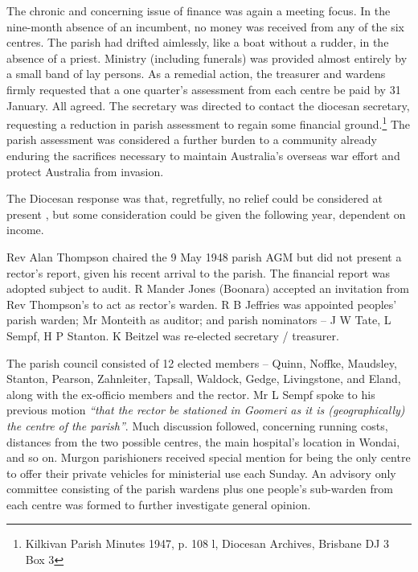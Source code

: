 The chronic and concerning issue of finance was again a meeting focus. In the nine-month absence of an incumbent, no money was received from any of the six centres. The parish had drifted aimlessly, like a boat without a rudder, in the absence of a priest. Ministry (including funerals) was provided almost entirely by a small band of lay persons. As a remedial action, the treasurer and wardens firmly requested that a one quarter's assessment from each centre be paid by 31 January. All agreed. The secretary was directed to contact the diocesan secretary, requesting a reduction in parish assessment to regain some financial ground.\footnote{Kilkivan Parish Minutes 1947, p. 108 l, Diocesan Archives, Brisbane DJ 3 Box 3} The parish assessment was considered a further burden to a community already enduring the sacrifices necessary to maintain Australia's overseas war effort and protect Australia from invasion.


The Diocesan response was that, regretfully, no relief could be considered at present , but some consideration could be given the following year, dependent on income.



Rev Alan Thompson chaired the 9 May 1948 parish AGM but did not present a rector's report, given his recent arrival to the parish. The financial report was adopted subject to audit. R Mander Jones (Boonara) accepted an invitation from Rev Thompson's to act as rector's warden. R B Jeffries was appointed peoples' parish warden; Mr Monteith as auditor; and parish nominators -- J W Tate, L Sempf, H P Stanton. K Beitzel was re-elected secretary / treasurer.



The parish council consisted of 12 elected members -- Quinn, Noffke, Maudsley, Stanton, Pearson, Zahnleiter, Tapsall, Waldock, Gedge, Livingstone, and Eland, along with the ex-officio members and the rector. Mr L Sempf spoke to his previous motion \emph{``that the rector be stationed in Goomeri as it is (geographically) the centre of the parish''}. Much discussion followed, concerning running costs, distances from the two possible centres, the main hospital's location in Wondai, and so on. Murgon parishioners received special mention for being the only centre to offer their private vehicles for ministerial use each Sunday. An advisory only committee consisting of the parish wardens plus one people's sub-warden from each centre was formed to further investigate general opinion.



